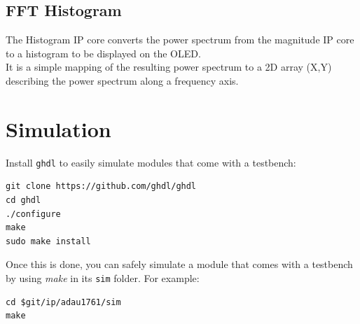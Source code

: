 \documentclass{article}
\begin{document}
\subsection{FFT Histogram}

The Histogram IP core converts
the power spectrum from the
magnitude IP core
to a histogram to be displayed on the OLED. \\

It is a simple mapping of the resulting
power spectrum to a 2D array (X,Y) describing
the power spectrum along a frequency axis. \\ 


\section{Simulation}

Install {\tt ghdl} to easily
simulate modules that come with a testbench:

\begin{verbatim}
git clone https://github.com/ghdl/ghdl
cd ghdl
./configure
make
sudo make install
\end{verbatim}

Once this is done, you can safely simulate a module
that comes with a testbench by using {\it make}
in its {\tt sim} folder.
For example:

\begin{verbatim}
cd $git/ip/adau1761/sim
make
\end{verbatim}
\end{document}
